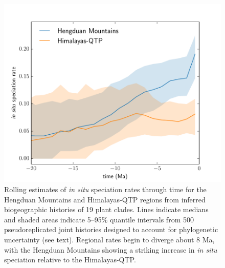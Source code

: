 \documentclass[9pt,twocolumn,twoside,lineno]{pnas-new}
\begin{document}
\begin{figure}
\centering
\includegraphics[width=.99\linewidth]{figures/figure_speciation_rates/figure_speciation_rates.pdf}
\caption{Rolling estimates of \textit{in situ} speciation rates
  through time for the Hengduan Mountains and Himalayas-QTP regions
  from inferred biogeographic histories of 19 plant clades. Lines
  indicate medians and shaded areas indicate 5--95\% quantile
  intervals from 500 pseudoreplicated joint histories designed to
  account for phylogenetic uncertainty (see text). Regional rates
  begin to diverge about 8 Ma, with the Hengduan Mountains showing a
  striking increase in \textit{in situ} speciation relative to the
  Himalayas-QTP.}
\label{fig:speciation}
\end{figure}
\end{document}
